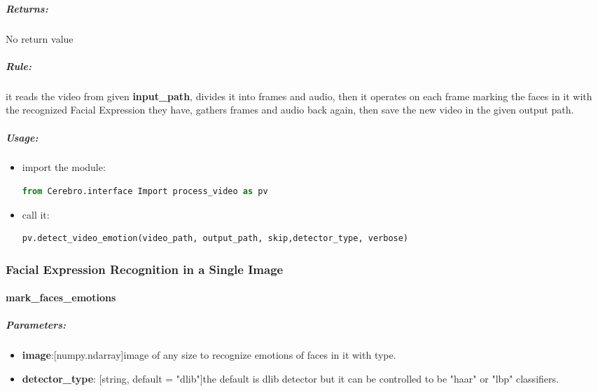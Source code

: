 \subparagraph{Returns:} 
\begin{changemargin}{1cm}{0cm} 
No return value
\end{changemargin}

\subparagraph{Rule:}
\begin{changemargin}{1cm}{0cm} 
it reads the video from given \textbf{input\_path}, divides it into frames and audio, then it operates on each frame marking the faces in it with the recognized Facial Expression they have, gathers frames and audio back again, then save the new video in the given output path.
\end{changemargin}

\subparagraph{Usage:}
\begin{changemargin}{0.5cm}{0cm} 
	\begin{itemize}
		\item import the module:
		\begin{lstlisting}[language=Python, caption=Python example]
		from Cerebro.interface Import process_video as pv\end{lstlisting}
		\item call it:
		\begin{lstlisting}[language=Python, caption=Python example]
		pv.detect_video_emotion(video_path, output_path, skip,detector_type, verbose)\end{lstlisting}
	\end{itemize}
\end{changemargin}


\subsubsection{Facial Expression Recognition in a Single Image}
\paragraph{mark\_faces\_emotions}

\subparagraph{Parameters:}
\begin{changemargin}{0.5cm}{0cm}
\begin{itemize}
	\item \textbf{image}:[numpy.ndarray]image of any size to recognize emotions of faces in it with type.
	\item \textbf{detector\_type}: [string, default = "dlib"]the default is dlib detector but it can be controlled to be "haar" or "lbp" classifiers.	
\end{itemize}
\end{changemargin}

